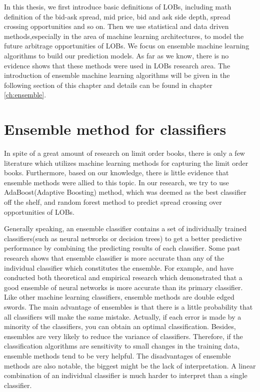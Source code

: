 In this thesis, we first introduce basic definitions of LOBs, including math definition of the bid-ask spread, mid price, bid and ask side depth, spread crossing opportunities and so on. Then we use statistical and data driven methods,especially in the area of machine learning architectures, to model the future arbitrage opportunities of LOBs. We focus on ensemble machine learning algorithms to build our prediction models. As far as we know, there is no evidence shows that these methods were used in LOBs research area. The introduction of ensemble machine learning algorithms will be given in the following section of this chapter and details can be found in chapter \ref{ch:ensemble}.  


\section{Ensemble method for classifiers}

In spite of a great amount of research on limit order books, there is only a few literature which utilizes machine learning methods for capturing the limit order books. Furthermore, based on our knowledge, there is little evidence that ensemble methods were allied to this topic. In our research, we try to use AdaBoost(Adaptive Boosting) method, which was deemed as the best classifier off the shelf\citep{kegl2013return}, and random forest method to predict spread crossing over opportunities of LOBs. 

Generally speaking, an ensemble classifier contains a set of individually trained classifiers(such as neural networks or decision trees) to get a better predictive performance by combining the predicting results of each classifier. Some past research shows that ensemble classifier is more accurate than any of the individual classifier which constitutes the ensemble. For example, \cite{hansen1990neural} and \cite{hashem1997optimal} have conducted both theoretical and empirical research which demonstrated that a good ensemble of neural networks is more accurate than its primary classifier. \\

Like other machine learning classifiers, ensemble methods are double edged swords. The main advantage of ensembles is that there is a little probability that all classifiers will make the same mistake. Actually, if each error is made by a minority of the classifiers, you can obtain an optimal classification. Besides, ensembles are very likely to reduce the variance of classifiers. Therefore, if the classification algorithms are sensitivity to small changes in the training data, ensemble methods tend to be very helpful.
The disadvantages of ensemble methods are also notable, the biggest might be the lack of interpretation\citep{buhlmann2012bagging}.  A linear combination of an individual classifier is much harder to interpret than a single classifier. 

